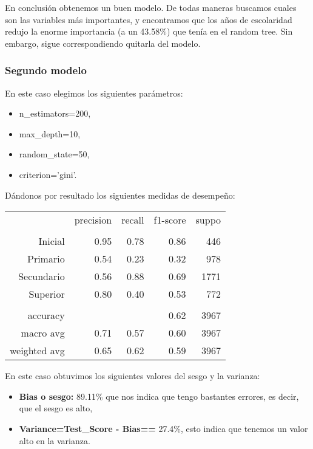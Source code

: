 \documentclass[a4paper]{article}
\begin{document}
             En conclusión obtenemos un buen modelo. De todas maneras buscamos cuales son las variables más importantes, y encontramos que los años de escolaridad redujo la enorme importancia (a un 43.58\%) que tenía en el random tree. Sin embargo, sigue correspondiendo quitarla del modelo.

        \subsubsection{Segundo modelo}

            En este caso elegimos los siguientes parámetros:
            \begin{itemize}
                \item n\_estimators=200,
                \item max\_depth=10,
                \item random\_state=50,
                \item criterion='gini'.
            \end{itemize}

            Dándonos por resultado los siguientes medidas de desempeño:
            \begin{table}[H]
                \centering
                \begin{tabular}{rrrrr}
                    ~ & precision & recall & f1-score & suppo \\
                    & & & & \\
                    Inicial    & 0.95 & 0.78 & 0.86 & 446 \\
                    Primario   & 0.54 & 0.23 & 0.32 & 978 \\
                    Secundario & 0.56 & 0.88 & 0.69 & 1771 \\
                    Superior   & 0.80 & 0.40 & 0.53 & 772 \\
                    & & & & \\
                    accuracy & & & 0.62 & 3967 \\
                    macro avg & 0.71 & 0.57 & 0.60 & 3967 \\
                    weighted avg & 0.65 & 0.62 & 0.59 & 3967 \\
                \end{tabular}
            \end{table}

            En este caso  obtuvimos los siguientes valores del sesgo y la varianza:
            \begin{itemize}
                \item \textbf{Bias o sesgo:} 89.11\% que nos indica que tengo bastantes errores, es decir, que el sesgo es alto,
                \item \textbf{Variance=Test\_Score - Bias==} 27.4\%, esto indica que tenemos un valor alto en la varianza.
             \end{itemize}
\end{document}
